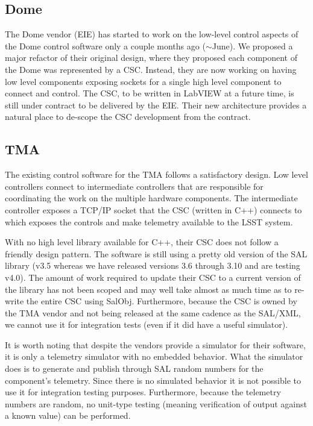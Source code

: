\documentclass[TS,authoryear,toc]{lsstdoc}
\begin{document}
\subsection{Dome}
The Dome vendor (EIE) has started to work on the low-level control aspects of the Dome control software only a couple months ago ($\sim$June). We proposed a major refactor of their original design, where they proposed each component of the Dome was represented by a CSC. Instead, they are now working on having low level components exposing sockets for a single high level component to connect and control. The CSC, to be written in LabVIEW at a future time, is still under contract to be delivered by the EIE. Their new architecture provides a natural place to de-scope the CSC development from the contract.

\subsection{TMA}
The existing control software for the TMA follows a satisfactory design. Low level controllers connect to intermediate controllers that are responsible for coordinating the work on the multiple hardware components. The intermediate controller exposes a TCP/IP socket that the CSC (written in C++) connects to which exposes the controls and make telemetry available to the LSST system. 

With no high level library available for C++, their CSC does not follow a friendly design pattern. The software is still using a pretty old version of the SAL library (v3.5 whereas we have released versions 3.6 through 3.10 and are testing v4.0). The amount of work required to update their CSC to a current version of the library has not been scoped and may well take almost as much time as to re-write the entire CSC using SalObj. Furthermore, because the CSC is owned by the TMA vendor and not being released at the same cadence as the SAL/XML, we cannot use it for integration tests (even if it did have a useful simulator).

It is worth noting that despite the vendors provide a simulator for their software, it is only a telemetry simulator with no embedded behavior. What the simulator does is to generate and publish through SAL random numbers for the component's telemetry. Since there is no simulated behavior it is not possible to use it for integration testing purposes. Furthermore, because the telemetry numbers are random, no unit-type testing (meaning verification of output against a known value) can be performed.
\end{document}
